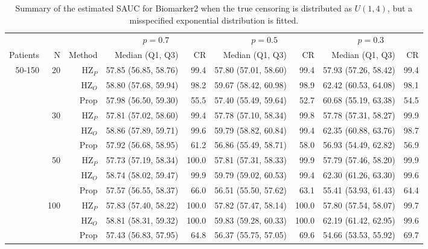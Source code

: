 \begin{table}[!htb]

\caption{\label{tab:sauc4}Summary of the estimated SAUC for Biomarker2 when the true censoring is distributed as $U(1,4)$, but a misspecified exponential distribution is fitted.}
\centering
\begin{threeparttable}
\begin{tabular}[t]{rrrrrrrrr}
\toprule
\multicolumn{1}{c}{} & \multicolumn{1}{c}{} & \multicolumn{1}{c}{} & \multicolumn{2}{c}{$p = 0.7$} & \multicolumn{2}{c}{$p = 0.5$} & \multicolumn{2}{c}{$p = 0.3$} \\
\cmidrule(l{3pt}r{3pt}){4-5} \cmidrule(l{3pt}r{3pt}){6-7} \cmidrule(l{3pt}r{3pt}){8-9}
Patients & N & Method & Median (Q1, Q3) & CR & Median (Q1, Q3) & CR & Median (Q1, Q3) & CR\\
\midrule
50-150 & 20 & HZ$_P$ & 57.85 (56.85, 58.76) & 99.4 & 57.80 (57.01, 58.60) & 99.4 & 57.93 (57.26, 58.42) & 99.4\\
 &  & HZ$_O$ & 58.80 (57.68, 59.94) & 98.2 & 59.67 (58.42, 60.98) & 98.9 & 62.42 (60.53, 64.08) & 98.1\\
 &  & Prop & 57.98 (56.50, 59.30) & 55.5 & 57.40 (55.49, 59.64) & 52.7 & 60.68 (55.19, 63.38) & 54.5\\
\addlinespace
 & 30 & HZ$_P$ & 57.81 (57.02, 58.60) & 99.4 & 57.78 (57.10, 58.34) & 99.8 & 57.78 (57.31, 58.27) & 99.9\\
 &  & HZ$_O$ & 58.86 (57.89, 59.71) & 99.6 & 59.79 (58.82, 60.84) & 99.4 & 62.35 (60.88, 63.76) & 98.7\\
 &  & Prop & 57.92 (56.68, 58.95) & 61.2 & 56.86 (55.49, 58.71) & 58.0 & 56.93 (54.49, 62.82) & 56.9\\
\addlinespace
 & 50 & HZ$_P$ & 57.73 (57.19, 58.34) & 100.0 & 57.81 (57.31, 58.33) & 99.9 & 57.79 (57.46, 58.20) & 99.9\\
 &  & HZ$_O$ & 58.74 (58.02, 59.47) & 99.9 & 59.79 (59.02, 60.53) & 99.4 & 62.30 (61.26, 63.30) & 99.6\\
 &  & Prop & 57.57 (56.55, 58.37) & 66.0 & 56.51 (55.50, 57.62) & 63.1 & 55.41 (53.93, 61.43) & 64.4\\
\addlinespace
 & 100 & HZ$_P$ & 57.83 (57.40, 58.22) & 100.0 & 57.82 (57.47, 58.14) & 100.0 & 57.80 (57.54, 58.07) & 99.7\\
 &  & HZ$_O$ & 58.81 (58.31, 59.32) & 100.0 & 59.83 (59.28, 60.33) & 100.0 & 62.19 (61.42, 62.95) & 99.6\\
 &  & Prop & 57.43 (56.83, 57.95) & 64.8 & 56.37 (55.75, 57.05) & 69.6 & 54.66 (53.53, 55.92) & 69.7\\

\end{tabular}
\end{threeparttable}
\end{table}
